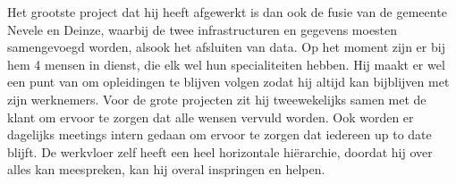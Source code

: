 \documentclass{article}
\begin{document}
\begin{enumerate}
        Het grootste project dat hij heeft afgewerkt is dan ook de fusie van de gemeente Nevele en Deinze,
        waarbij de twee infrastructuren en gegevens moesten samengevoegd worden, alsook het afsluiten van data.
        Op het moment zijn er bij hem 4 mensen in dienst, die elk wel hun specialiteiten hebben. 
        Hij maakt er wel een punt van om opleidingen te blijven volgen 
        zodat hij altijd kan bijblijven met zijn werknemers.
        \newpage
        Voor de grote projecten zit hij tweewekelijks samen met de klant om ervoor te zorgen dat alle wensen vervuld worden.
        Ook worden er dagelijks meetings intern gedaan om ervoor te zorgen dat iedereen up to date blijft.
        De werkvloer zelf heeft een heel horizontale hiërarchie, doordat hij over alles kan meespreken, kan hij overal inspringen en helpen.
    \end{enumerate}
\end{document}
